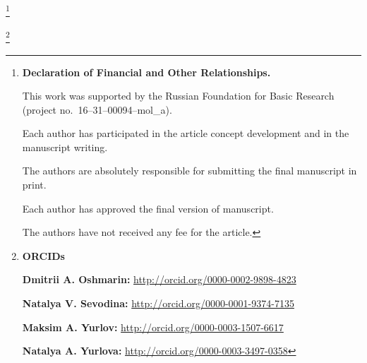 \makeentitle



\pagebreak



\thanks{{\bf Declaration of Financial and Other Relationships.}

This work was supported by  the Russian Foundation for Basic Research (project no.~16--31--00094--mol\_a).

Each author has participated in the article concept development and in the manuscript writing.

The authors are absolutely responsible for submitting the final manuscript in print.

Each author has approved the final version of manuscript.

The authors have not received any fee for the article.

}







\thanks{{\bf ORCIDs}



{\bf Dmitrii A. Oshmarin:}    \url{http://orcid.org/0000-0002-9898-4823}



{\bf   Natalya V. Sevodina:}  \url{http://orcid.org/0000-0001-9374-7135}



{\bf  Maksim A. Yurlov:}  \url{http://orcid.org/0000-0003-1507-6617}



{\bf  Natalya A. Yurlova:}  \url{http://orcid.org/0000-0003-3497-0358}

}





\EngRef


